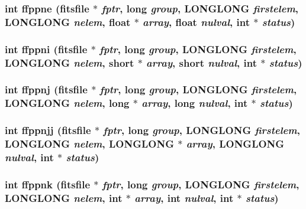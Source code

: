 \subsubsection{\setlength{\rightskip}{0pt plus 5cm}int ffppne (\bf{fitsfile} $\ast$ {\em fptr}, long {\em group}, \bf{LONGLONG} {\em firstelem}, \bf{LONGLONG} {\em nelem}, float $\ast$ {\em array}, float {\em nulval}, int $\ast$ {\em status})}\label{fitsio__64_8h_01aa3f24254f8d3895463d830679fc52}


\subsubsection{\setlength{\rightskip}{0pt plus 5cm}int ffppni (\bf{fitsfile} $\ast$ {\em fptr}, long {\em group}, \bf{LONGLONG} {\em firstelem}, \bf{LONGLONG} {\em nelem}, short $\ast$ {\em array}, short {\em nulval}, int $\ast$ {\em status})}\label{fitsio__64_8h_784592ce7e18c4280a1956b6f39cc70f}


\subsubsection{\setlength{\rightskip}{0pt plus 5cm}int ffppnj (\bf{fitsfile} $\ast$ {\em fptr}, long {\em group}, \bf{LONGLONG} {\em firstelem}, \bf{LONGLONG} {\em nelem}, long $\ast$ {\em array}, long {\em nulval}, int $\ast$ {\em status})}\label{fitsio__64_8h_4a7b775c21b67c8744fbd23f9a3c1789}


\subsubsection{\setlength{\rightskip}{0pt plus 5cm}int ffppnjj (\bf{fitsfile} $\ast$ {\em fptr}, long {\em group}, \bf{LONGLONG} {\em firstelem}, \bf{LONGLONG} {\em nelem}, \bf{LONGLONG} $\ast$ {\em array}, \bf{LONGLONG} {\em nulval}, int $\ast$ {\em status})}\label{fitsio__64_8h_76ad1e16557d84ed3f528848a243db06}


\subsubsection{\setlength{\rightskip}{0pt plus 5cm}int ffppnk (\bf{fitsfile} $\ast$ {\em fptr}, long {\em group}, \bf{LONGLONG} {\em firstelem}, \bf{LONGLONG} {\em nelem}, int $\ast$ {\em array}, int {\em nulval}, int $\ast$ {\em status})}\label{fitsio__64_8h_eb3b195b63cb8a9b04d47cf6b8fda66a}


